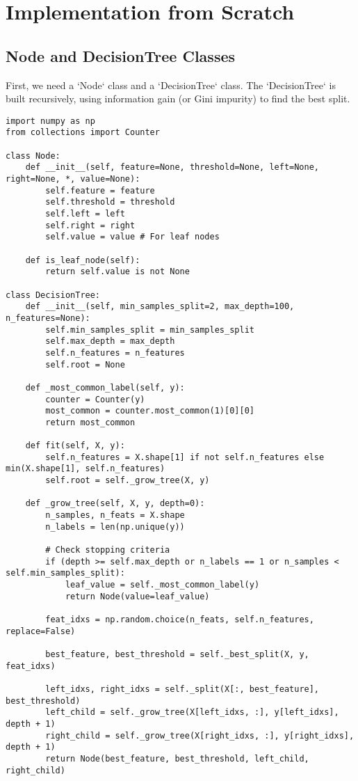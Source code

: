 \documentclass[12pt,a4paper]{article}
\begin{document}
\section{Implementation from Scratch}

\subsection{Node and DecisionTree Classes}
First, we need a `Node` class and a `DecisionTree` class. The `DecisionTree` is built recursively, using information gain (or Gini impurity) to find the best split.

\begin{lstlisting}
import numpy as np
from collections import Counter

class Node:
    def __init__(self, feature=None, threshold=None, left=None, right=None, *, value=None):
        self.feature = feature
        self.threshold = threshold
        self.left = left
        self.right = right
        self.value = value # For leaf nodes

    def is_leaf_node(self):
        return self.value is not None

class DecisionTree:
    def __init__(self, min_samples_split=2, max_depth=100, n_features=None):
        self.min_samples_split = min_samples_split
        self.max_depth = max_depth
        self.n_features = n_features
        self.root = None

    def _most_common_label(self, y):
        counter = Counter(y)
        most_common = counter.most_common(1)[0][0]
        return most_common

    def fit(self, X, y):
        self.n_features = X.shape[1] if not self.n_features else min(X.shape[1], self.n_features)
        self.root = self._grow_tree(X, y)

    def _grow_tree(self, X, y, depth=0):
        n_samples, n_feats = X.shape
        n_labels = len(np.unique(y))

        # Check stopping criteria
        if (depth >= self.max_depth or n_labels == 1 or n_samples < self.min_samples_split):
            leaf_value = self._most_common_label(y)
            return Node(value=leaf_value)

        feat_idxs = np.random.choice(n_feats, self.n_features, replace=False)

        best_feature, best_threshold = self._best_split(X, y, feat_idxs)

        left_idxs, right_idxs = self._split(X[:, best_feature], best_threshold)
        left_child = self._grow_tree(X[left_idxs, :], y[left_idxs], depth + 1)
        right_child = self._grow_tree(X[right_idxs, :], y[right_idxs], depth + 1)
        return Node(best_feature, best_threshold, left_child, right_child)


\end{lstlisting}
\end{document}

